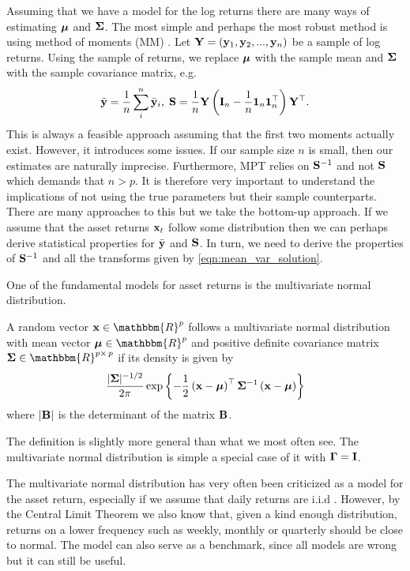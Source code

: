 \documentclass[]{book}\usepackage{knitr}
\begin{document}
Assuming that we have a model for the log returns there are many ways of estimating $\mbox{\boldmath$\mu$}$ and $\mathbf{\Sigma}$.
The most simple and perhaps the most robust method is using method of moments (MM) \cite{REF}. 
Let $\mathbf{Y} = (\mathbf{y}_1, \mathbf{y}_2, ..., \mathbf{y}_n)$ be a sample of log returns.
Using the sample of returns, we replace $\mbox{\boldmath$\mu$}$ with the sample mean and $\mathbf{\Sigma}$ with the sample covariance matrix, e.g.
$$
\bar{\mathbf{y}} = \frac{1}{n} \sum_i^n \bar{\mathbf{y}}_i, \; \mathbf{S} = \frac{1}{n}\mathbf{Y} \left(\mathbf{I}_n - \frac{1}{n} \mathbf{1}_n \mathbf{1}_n^\top \right) \mathbf{Y}^\top.
$$
This is always a feasible approach assuming that the first two moments actually exist. 
However, it introduces some issues.
If our sample size $n$ is small, then our estimates are naturally imprecise. 
Furthermore, MPT relies on $\mathbf{S}^{-1}$ and not $\mathbf{S}$ which demands that $n>p$. 
It is therefore very important to understand the implications of not using the true parameters but their sample counterparts.
There are many approaches to this but we take the bottom-up approach. 
If we assume that the asset returns $\mathbf{x}_t$ follow some distribution then we can perhaps derive statistical properties for $\bar{\mathbf{y}}$ and $\mathbf{S}$.
In turn, we need to derive the properties of $\mathbf{S}^{-1}$ and all the transforms given by \eqref{eqn:mean_var_solution}.

One of the fundamental models for asset returns is the multivariate normal distribution. 
\begin{definition}
	A random vector $\bx \in \mathbbm{R}^p$ follows a multivariate normal distribution with mean vector $\bmu \in \mathbbm{R}^p$ and positive definite covariance matrix  $\bSigma \in \mathbbm{R}^{p \times\, p}$ if its density is given by 
	\begin{equation}\label{eqn:multi_density}
	\frac{|\mathbf{\Sigma}|^{-1/2}}{2\pi} \exp \left\{-\frac{1}{2} \left(\mathbf{x} - \mbox{\boldmath$\mu$} \right)^\top\mathbf{\Sigma}^{-1}\left(\mathbf{x} - \mbox{\boldmath$\mu$} \right) \right\}
	\end{equation}
	where $|\mathbf{B}|$ is the determinant of the matrix $\mathbf{B}$.
\end{definition}
The definition is slightly more general than what we most often see. The multivariate normal distribution is simple a special case of it with $\boldsymbol{\Gamma} = \mathbf{I}$. 

The multivariate normal distribution has very often been criticized as a model for the asset return, especially if we assume that daily returns are i.i.d \cite{cont2001empirical}. However, by the Central Limit Theorem we also know that, given a kind enough distribution, returns on a lower frequency such as weekly, monthly or quarterly should be close to normal. The model can also serve as a benchmark, since all models are wrong but it can still be useful. 
\end{document}

